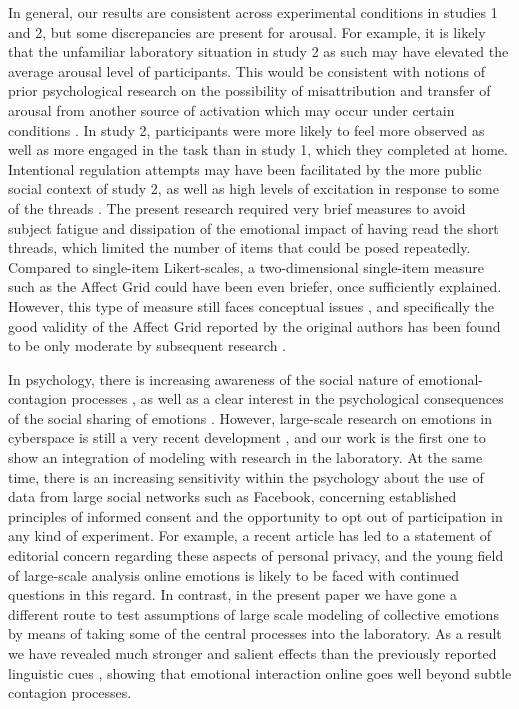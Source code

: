 \documentclass[nologo,url,11pt,a4paper]{ETHpaper}
\begin{document}
In general, our results are consistent across experimental conditions in
studies 1 and 2, but some discrepancies are present for arousal. For example,
it is likely that the unfamiliar laboratory situation in study 2 as such may
have elevated the average arousal level of participants. This would be
consistent with notions of prior psychological research on the possibility of
misattribution and transfer of arousal from another source of activation which
may occur under certain conditions \cite{Zillmann1974,Cummins2012}.   In study
2, participants were more likely to feel more observed as well as more engaged
in the task than in study 1, which they completed at home. Intentional
regulation attempts may have been facilitated by the more public social
context of study 2, as well as high levels of excitation in response to some
of the threads \cite{Kappas2011}. The present research required very
brief measures to avoid subject fatigue and dissipation of the
emotional impact of having read the short threads, which limited the number of
items that could be posed repeatedly. Compared to single-item Likert-scales, a
two-dimensional single-item measure  such as the Affect Grid
\cite{Russell1989} could have been even briefer, once sufficiently explained.
However, this type of measure still faces conceptual issues \cite{Gray2007},
and specifically the good validity of the Affect Grid reported by the original
authors \cite{Russell1989} has been found to be only moderate by subsequent
research \cite{Killgore1998}. 


In psychology, there is increasing awareness of the social nature of
emotional-contagion processes \cite{Kleef2009}, as well as a clear interest in
the psychological consequences of the social sharing of emotions
\cite{Curci2012,Nils2012}. However, large-scale research on emotions in
cyberspace is still a very recent development \cite{Kappas2013},  and our work
is the first one to show an integration of modeling with  research in the laboratory. At
the same time, there is an increasing sensitivity within the psychology about the use of data from large social networks such as Facebook,
concerning established principles of informed consent and the opportunity to
opt out of participation in any kind of experiment. For example, a recent
article \cite{Kramer2014} has led to a statement of editorial concern
regarding these aspects of personal privacy, and the young field of large-scale analysis  online emotions  is likely to be faced with continued
questions in this regard. In contrast, in the present paper we have gone a
different route to test assumptions of large scale modeling of collective
emotions by means of taking some of the central processes into the laboratory.
As a result we have revealed much stronger and salient effects than the
previously reported linguistic cues \cite{Kramer2014},  showing that emotional interaction online goes well beyond subtle contagion processes.
\end{document}
